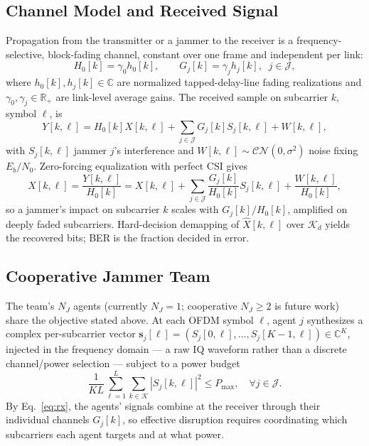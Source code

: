 \documentclass[conference]{IEEEtran}
\newcommand{\rar}[1]{{\color{blue}{[#1]}}}
\begin{document}
\subsection{Channel Model and Received Signal}
Propagation from the transmitter or a jammer to the receiver is a
frequency-selective, block-fading channel, constant over one frame and
independent per link:
\begin{equation}
H_0[k]=\gamma_0 h_0[k], \qquad G_j[k]=\gamma_j h_j[k],\;\; j\in\mathcal{J},
\label{eq:channel}
\end{equation}
where $h_0[k],h_j[k]\in\mathbb{C}$ are normalized tapped-delay-line fading
realizations and $\gamma_0,\gamma_j\in\mathbb{R}_+$ are link-level average
gains. \rar{$\gamma$: stand-in for geometry; TDL params in Experiment Setup.}
The received sample on subcarrier $k$, symbol $\ell$, is
\begin{equation}
Y[k,\ell] = H_0[k]X[k,\ell] + \sum_{j\in\mathcal{J}} G_j[k]S_j[k,\ell] + W[k,\ell],
\label{eq:rx}
\end{equation}
with $S_j[k,\ell]$ jammer $j$'s interference and
$W[k,\ell]\sim\mathcal{CN}(0,\sigma^2)$ noise fixing $E_b/N_0$. Zero-forcing
equalization with perfect CSI gives
\begin{equation}
\hat{X}[k,\ell] = \frac{Y[k,\ell]}{H_0[k]}
= X[k,\ell] + \sum_{j\in\mathcal{J}}\frac{G_j[k]}{H_0[k]}S_j[k,\ell]
+ \frac{W[k,\ell]}{H_0[k]},
\label{eq:zf}
\end{equation}
so a jammer's impact on subcarrier $k$ scales with $G_j[k]/H_0[k]$, amplified
on deeply faded subcarriers. \rar{This ratio does not empirically favor
channel-aware over blind jamming; see Results.} Hard-decision demapping of
$\hat{X}[k,\ell]$ over $\mathcal{K}_d$ yields the recovered bits; BER is the
fraction decided in error.


\subsection{Cooperative Jammer Team}
\label{sec:jammer}
The team's $N_J$ agents (currently $N_J{=}1$; cooperative $N_J{\geq}2$ is
future work) share the objective stated above. At each OFDM symbol $\ell$,
agent $j$ synthesizes a complex per-subcarrier vector
$\mathbf{s}_j[\ell]=(S_j[0,\ell],\ldots,S_j[K-1,\ell])\in\mathbb{C}^K$,
injected in the frequency domain --- a raw IQ waveform rather than a discrete
channel/power selection --- subject to a power budget
\begin{equation}
\frac{1}{KL}\sum_{\ell=1}^L\sum_{k\in\mathcal{K}}|S_j[k,\ell]|^2 \leq P_{\max},
\quad \forall j\in\mathcal{J}.
\label{eq:power}
\end{equation}
By Eq.~\eqref{eq:rx}, the agents' signals combine at the receiver through
their individual channels $G_j[k]$, so effective disruption requires
coordinating which subcarriers each agent targets and at what power.
\end{document}
